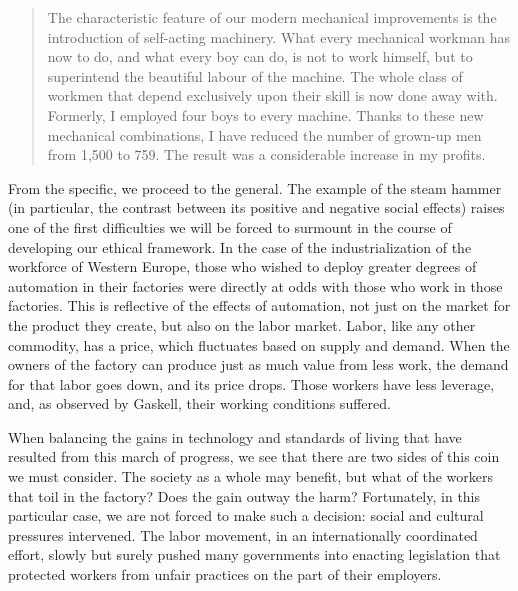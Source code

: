 \begin{quotation}\small
  The characteristic feature of our modern mechanical 
  improvements is the introduction of self-acting machinery. What every 
  mechanical workman has now to do, and what every boy can do, is not to 
  work himself, but to superintend the beautiful labour of the machine. 
  The whole class of workmen that depend exclusively upon their skill is 
  now done away with. Formerly, I employed four boys to every machine. 
  Thanks to these new mechanical combinations, I have reduced the number 
  of grown-up men from 1,500 to 759. The result was a considerable 
  increase in my profits.\cite{marx1867strife}
\end{quotation}

From the specific, we proceed to the general.  The example of the steam 
hammer (in particular, the contrast between its positive and negative 
social effects) raises one of the first difficulties we will be forced to 
surmount in the course of developing our ethical framework.  
In the case of the industrialization of the workforce of Western 
Europe, those who wished to deploy greater 
degrees of automation in their factories were directly at odds 
with those who work in those factories.  This is reflective of 
the effects of automation, not just on the market for the product they 
create, but also on the labor market.  Labor, like any other commodity, 
has a price, which fluctuates based on supply and demand.  When the 
owners of the factory can produce just as much value from less work, 
the demand for that labor goes down, and its price drops.  Those 
workers have less leverage, and, as observed by Gaskell, their working 
conditions suffered.

When balancing the gains in technology and standards of living that 
have resulted from this march of progress, we see that there are two 
sides of this coin we must consider.  The society as a whole may 
benefit, but what of the workers that toil in the factory?  Does the 
gain outway the harm?  Fortunately, in this particular case, we are not 
forced to make such a decision: social and cultural pressures intervened.  
The labor movement, in an internationally 
coordinated effort, slowly but surely pushed many governments 
into enacting legislation that protected workers from unfair practices 
on the part of their employers.


